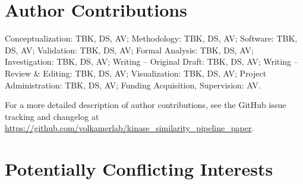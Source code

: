 \documentclass[9pt,training,ASAPversion]{livecoms}
\newcommand{\githubrepository}{\url{https://github.com/volkamerlab/kinase_similarity_pipeline_paper}}  %
\begin{document}
\section*{Author Contributions}
%

Conceptualization: TBK, DS, AV; Methodology: TBK, DS, AV; Software: TBK, DS, AV; Validation: TBK, DS, AV; Formal Analysis: TBK, DS, AV; Investigation: TBK, DS, AV; Writing -- Original Draft: TBK, DS, AV; Writing -- Review \& Editing: TBK, DS, AV; Visualization: TBK, DS, AV; Project Administration: TBK, DS, AV; Funding Acquisition, Supervision: AV.

For a more detailed description of author contributions,
see the GitHub issue tracking and changelog at \githubrepository.

%


\section*{Potentially Conflicting Interests}
\end{document}
